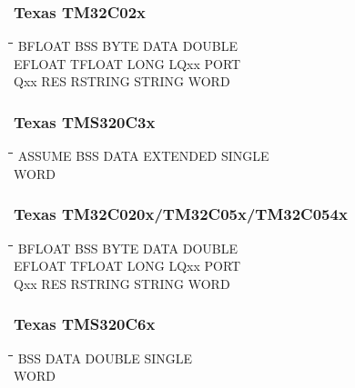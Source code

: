 \subsubsection{Texas TM32C02x}
{\tt\begin{tabbing}
\hspace{3cm}\=\hspace{3cm}\=\hspace{3cm}\=\hspace{3cm}\=\kill
BFLOAT     \> BSS         \> BYTE        \> DATA        \> DOUBLE \\ 
EFLOAT     \> TFLOAT      \> LONG        \> LQxx        \> PORT \\
Qxx        \> RES         \> RSTRING     \> STRING      \> WORD \\
\end{tabbing}}

\subsubsection{Texas TMS320C3x}
{\tt\begin{tabbing}
\hspace{3cm}\=\hspace{3cm}\=\hspace{3cm}\=\hspace{3cm}\=\kill
ASSUME     \> BSS         \> DATA        \> EXTENDED    \> SINGLE \\
WORD \\
\end{tabbing}}

\subsubsection{Texas TM32C020x/TM32C05x/TM32C054x}
{\tt\begin{tabbing}
\hspace{3cm}\=\hspace{3cm}\=\hspace{3cm}\=\hspace{3cm}\=\kill
BFLOAT     \> BSS         \> BYTE        \> DATA        \> DOUBLE \\
EFLOAT     \> TFLOAT      \> LONG        \> LQxx        \> PORT \\
Qxx        \> RES         \> RSTRING     \> STRING      \> WORD \\
\end{tabbing}}

\subsubsection{Texas TMS320C6x}
{\tt\begin{tabbing}
\hspace{3cm}\=\hspace{3cm}\=\hspace{3cm}\=\hspace{3cm}\=\kill
BSS         \> DATA        \> DOUBLE     \> SINGLE \\
WORD \\
\end{tabbing}}

